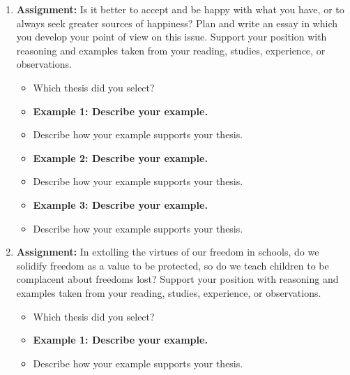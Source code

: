\begin{enumerate}

\item \large{\bf{Assignment:}} Is it better to accept and be happy with what you have, or to always seek greater sources of happiness? Plan and write an essay in which you develop your point of view on this issue. Support your position with reasoning and examples taken from your reading, studies, experience, or observations.

\begin{itemize}
\item Which thesis did you select? \hrulefill
\item \bf{Example 1:} Describe your example. \hrulefill

\hrulefill

\item Describe how your example supports your thesis. \hrulefill

\hrulefill

\item \bf{Example 2:} Describe your example. \hrulefill

\hrulefill

\item Describe how your example supports your thesis. \hrulefill

\hrulefill

\item \bf{Example 3:} Describe your example. \hrulefill

\hrulefill

\item Describe how your example supports your thesis. \hrulefill

\hrulefill
\end{itemize}

\item\large{\bf{Assignment:}} In extolling the virtues of our freedom in schools, do we solidify freedom as a value to be protected, so do we teach children to be complacent about freedoms lost? Support your position with reasoning and examples taken from your reading, studies, experience, or observations.

\begin{itemize}
\item Which thesis did you select? \hrulefill
\item \bf{Example 1:} Describe your example. \hrulefill

\hrulefill

\item Describe how your example supports your thesis. \hrulefill


\end{itemize}
\end{enumerate}
